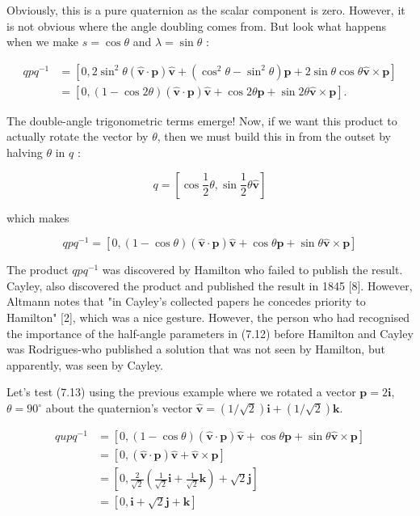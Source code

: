 Obviously, this is a pure quaternion as the scalar component is zero. However, it is not obvious where the angle doubling comes from. But look what happens when we make $s=\cos \theta$ and $\lambda=\sin \theta$ :

$$
\begin{aligned}
q p q^{-1} & =\left[0,2 \sin ^{2} \theta(\hat{\mathbf{v}} \cdot \mathbf{p}) \hat{\mathbf{v}}+\left(\cos ^{2} \theta-\sin ^{2} \theta\right) \mathbf{p}+2 \sin \theta \cos \theta \hat{\mathbf{v}} \times \mathbf{p}\right] \\
& =[0,(1-\cos 2 \theta)(\hat{\mathbf{v}} \cdot \mathbf{p}) \hat{\mathbf{v}}+\cos 2 \theta \mathbf{p}+\sin 2 \theta \hat{\mathbf{v}} \times \mathbf{p}] .
\end{aligned}
$$

The double-angle trigonometric terms emerge! Now, if we want this product to actually rotate the vector by $\theta$, then we must build this in from the outset by halving $\theta$ in $q$ :

$$
q=\left[\cos \frac{1}{2} \theta, \sin \frac{1}{2} \theta \hat{\mathbf{v}}\right]
$$

which makes

$$
q p q^{-1}=[0,(1-\cos \theta)(\hat{\mathbf{v}} \cdot \mathbf{p}) \hat{\mathbf{v}}+\cos \theta \mathbf{p}+\sin \theta \hat{\mathbf{v}} \times \mathbf{p}]
$$

The product $q p q^{-1}$ was discovered by Hamilton who failed to publish the result. Cayley, also discovered the product and published the result in 1845 [8]. However, Altmann notes that "in Cayley's collected papers he concedes priority to Hamilton" [2], which was a nice gesture. However, the person who had recognised the importance of the half-angle parameters in (7.12) before Hamilton and Cayley was Rodrigues-who published a solution that was not seen by Hamilton, but apparently, was seen by Cayley.

Let's test (7.13) using the previous example where we rotated a vector $\mathbf{p}=2 \mathbf{i}$, $\theta=90^{\circ}$ about the quaternion's vector $\hat{\mathbf{v}}=(1 / \sqrt{2}) \mathbf{i}+(1 / \sqrt{2}) \mathbf{k}$.

$$
\begin{aligned}
q u p q^{-1} & =[0,(1-\cos \theta)(\hat{\mathbf{v}} \cdot \mathbf{p}) \hat{\mathbf{v}}+\cos \theta \mathbf{p}+\sin \theta \hat{\mathbf{v}} \times \mathbf{p}] \\
& =[0,(\hat{\mathbf{v}} \cdot \mathbf{p}) \hat{\mathbf{v}}+\hat{\mathbf{v}} \times \mathbf{p}] \\
& =\left[0, \frac{2}{\sqrt{2}}\left(\frac{1}{\sqrt{2}} \mathbf{i}+\frac{1}{\sqrt{2}} \mathbf{k}\right)+\sqrt{2} \mathbf{j}\right] \\
& =[0, \mathbf{i}+\sqrt{2} \mathbf{j}+\mathbf{k}]
\end{aligned}
$$

